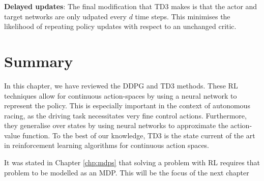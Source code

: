 \textbf{Delayed updates}:
The final modification that TD3 makes is that the actor and target networks are only udpated every $d$ time steps.
This minimises the likelihood of repeating policy  updates with respect to an unchanged critic.



\section{Summary}
In this chapter, we have reviewed the DDPG and TD3 methods.
These RL techniques allow for continuous action-spaces by using a neural network to represent the policy.
This is especially important in the context of autonomous racing, as the driving task necessitates very fine control actions.
Furthermore, they generalise over states by using neural networks to approximate the action-value function.
To the best of our knowledge, TD3 is the state current of the art in reinforcement learning algorithms for continuous action spaces.

It was stated in Chapter \ref{chp:mdps} that solving a problem with RL requires that problem to be modelled as an MDP.
This will be the focus of the next chapter

% 
